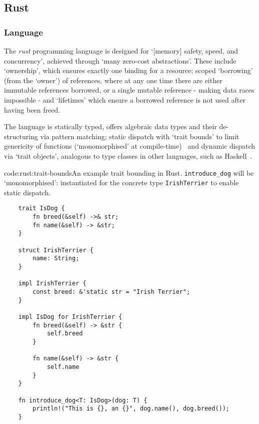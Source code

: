 \subsection{Rust} \label{bg:rust}

\subsubsection{Language} \label{bg:rust:lang}
The \emph{rust} programming language is designed for `[memory] safety, speed, and concurrency', achieved through `many zero-cost abstractions'. These include `ownership', which ensures exactly one binding for a resource; scoped `borrowing' (from the `owner') of references, where at any one time there are either immutable references borrowed, or a single mutable reference - making data races impossible - and `lifetimes' which ensure a borrowed reference is not used after having been freed. \cite{rust_book}

The language is statically typed, offers algebraic data types  and their de-structuring via pattern matching; \cite{rust_match_mut_move} static dispatch with `trait bounds' to limit genericity of functions (`monomorphised' at compile-time)~\cite{rust_book} and dynamic dispatch via `trait objects', analogous to type classes in other languages, such as Haskell~\cite{rust_functional}. \cite{rust_type_system}

\begin{codelisting}{code:rust:trait-bounds}{An example trait bounding in Rust. \texttt{introduce_dog} will be `monomorphised': instantiated for the concrete type \texttt{IrishTerrier} to enable static dispatch.}
\begin{verbatim}
    trait IsDog {
        fn breed(&self) ->& str;
        fn name(&self) -> &str;
    }
    
    struct IrishTerrier {
        name: String;
    }
    
    impl IrishTerrier {
        const breed: &'static str = "Irish Terrier";
    }
    
    impl IsDog for IrishTerrier {
        fn breed(&self) -> &str {
        	self.breed
        }
        
        fn name(&self) -> &str {
        	self.name
        }
    }
    
    fn introduce_dog<T: IsDog>(dog: T) {
        println!("This is {}, an {}", dog.name(), dog.breed());
    }
\end{verbatim}
\end{codelisting}

